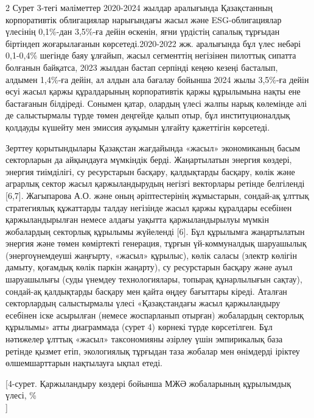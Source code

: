 \begin{multicols}{2}
Сурет 3-тегі мәліметтер 2020-2024 жылдар аралығында Қазақстанның
корпоративтік облигациялар нарығындағы жасыл және ESG-облигациялар
үлесінің 0,1\%-дан 3,5\%-ға дейін өскенін, яғни үрдістің сапалық
тұрғыдан біртіндеп жоғарылағанын көрсетеді.2020-2022 жж. аралығында бұл
үлес небәрі 0,1-0,4\% шегінде баяу ұлғайып, жасыл сегменттің негізінен
пилоттық сипатта болғанын байқатса, 2023 жылдан бастап серпінді кеңею
кезеңі басталып, алдымен 1,4\%-ға дейін, ал алдын ала бағалау бойынша
2024 жылы 3,5\%-ға дейін өсуі жасыл қаржы құралдарының корпоративтік
қаржы құрылымына нақты ене бастағанын білдіреді. Сонымен қатар, олардың
үлесі жалпы нарық көлемінде әлі де салыстырмалы түрде төмен деңгейде
қалып отыр, бұл институционалдық қолдауды күшейту мен эмиссия ауқымын
ұлғайту қажеттігін көрсетеді.

Зерттеу қорытындылары Қазақстан жағдайында «жасыл» экономиканың басым
секторларын да айқындауға мүмкіндік берді. Жаңартылатын энергия көздері,
энергия тиімділігі, су ресурстарын басқару, қалдықтарды басқару, көлік
және аграрлық сектор жасыл қаржыландырудың негізгі векторлары ретінде
белгіленді {[}6,7{]}. Жагыпарова А.О. және оның әріптестерінің
жұмыстарын, сондай-ақ ұлттық стратегиялық құжаттарды талдау негізінде
жасыл қаржы құралдары есебінен қаржыландырылған немесе алдағы уақытта
қаржыландырылуы мүмкін жобалардың секторлық құрылымы жүйеленді {[}6{]}.
Бұл құрылымға жаңартылатын энергия және төмен көміртекті генерация,
тұрғын үй-коммуналдық шаруашылық (энергоүнемдеуші жаңғырту, «жасыл»
құрылыс), көлік саласы (электр көлігін дамыту, қоғамдық көлік паркін
жаңарту), су ресурстарын басқару және ауыл шаруашылығы (суды үнемдеу
технологиялары, топырақ құнарлылығын сақтау), сондай-ақ қалдықтарды
басқару мен қайта өңдеу бағыттары кіреді. Аталған секторлардың
салыстырмалы үлесі «Қазақстандағы жасыл қаржыландыру есебінен іске
асырылған (немесе жоспарланып отырған) жобалардың секторлық құрылымы»
атты диаграммада (сурет 4) көрнекі түрде көрсетілген. Бұл нәтижелер
ұлттық «жасыл» таксономияны әзірлеу үшін эмпирикалық база ретінде қызмет
етіп, экологиялық тұрғыдан таза жобалар мен өнімдерді іріктеу
өлшемшарттарын нақтылауға ықпал етеді.
\end{multicols}

[4-сурет. Қаржыландыру көздері бойынша МЖӘ жобаларының құрылымдық
үлесі, \%\\]

